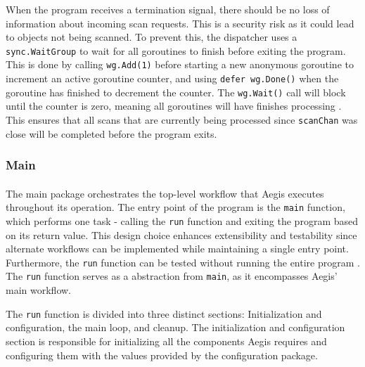 \documentclass[12pt, conference, final, a4paper, onecolumn, compsoc]{IEEEtran}
\begin{document}
When the program receives a termination signal, there should be no loss of
information about incoming scan requests. This is a security risk as it could
lead to objects not being scanned. To prevent this, the dispatcher uses a
\texttt{sync.WaitGroup} to wait for all goroutines to finish before exiting the
program. This is done by calling \texttt{wg.Add(1)} before starting a new
anonymous goroutine to increment an active goroutine counter, and using
\texttt{defer wg.Done()} when the goroutine has finished to decrement the
counter. The \texttt{wg.Wait()} call will block until the counter is zero,
meaning all goroutines will have finishes processing \citep{go-waitgroups}. This
ensures that all scans that are currently being processed since
\texttt{scanChan} was close will be completed before the program exits.

\subsubsection*{Main}
\paragraph{}


The main package orchestrates the top-level workflow that Aegis executes
throughout its operation. The entry point of the program is the \texttt{main}
function, which performs one task - calling the \texttt{run} function and
exiting the program based on its return value. This design choice enhances
extensibility and testability since alternate workflows can be implemented while
maintaining a single entry point. Furthermore, the \texttt{run} function can be
tested without running the entire program \citep{go-tiny-abstraction}. The
\texttt{run} function serves as a abstraction from \texttt{main}, as it
encompasses Aegis' main workflow.

The \texttt{run} function is divided into three distinct sections:
Initialization and configuration, the main loop, and cleanup. The initialization
and configuration section is responsible for initializing all the components
Aegis requires and configuring them with the values provided by the
configuration package.
\end{document}
